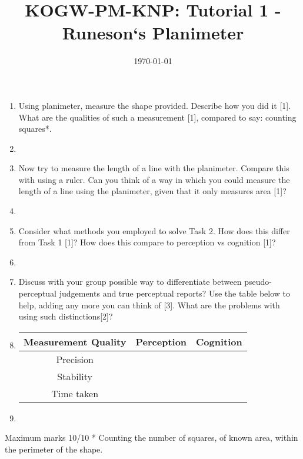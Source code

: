\documentclass[12pt,english]{scrartcl}
\title{KOGW-PM-KNP: Tutorial 1 - Runeson`s Planimeter}
\author{}
\date{\today}
\begin{document}
\maketitle

\begin{enumerate}
 \item Using planimeter, measure the shape provided. Describe how you did it [1]. What are the qualities of such a measurement [1], compared to say: counting squares*.
 \item[]
 \item Now try to measure the length of a line with the planimeter. Compare this with using a ruler. Can you think of a way in which you could measure the length of a line using the planimeter, given that it only measures area [1]?
 \item[]
 \item Consider what methods you employed to solve Task 2. How does this differ from Task 1 [1]? How does this compare to perception vs cognition [1]?
 \item[]
 \item Discuss with your group possible way to differentiate between pseudo-perceptual judgements and true perceptual reports? Use the table below to help, adding any more you can think of [3]. What are the problems with using such distinctions[2]?
 \item[]

  \begin{center}
   \begin{tabular}{ || c c c || } 
   \hline
   Measurement Quality & Perception & Cognition \\ 
   \hline
   Precision &  &  \\ 
   \hline
   Stability &  &   \\ 
   \hline
   Time taken  &  &  \\
   \hline
   \end{tabular}
  \end{center}
  \item[]

 \end{enumerate}

 Maximum marks 10/10
 * Counting the number of squares, of known area, within the perimeter of the shape.
\end{document}
